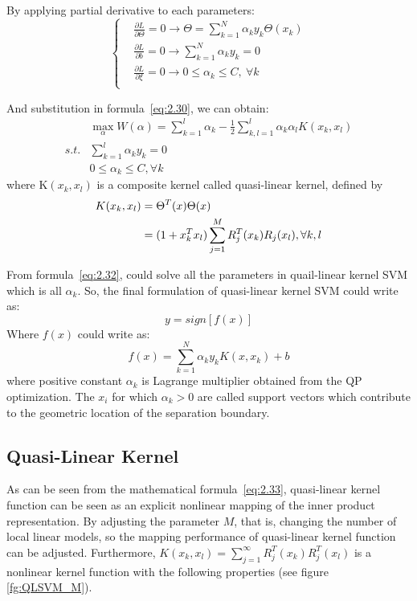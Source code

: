 \documentclass[master]{IPSstyle}
\begin{document}
{By applying partial derivative to each parameters:
\begin{equation}\label{eq:2.31}
\left\{ 
\begin{aligned}
&\frac{\partial L}{\partial\Theta}=0 \to \Theta=\sum_{k=1}^{N}\alpha_ky_k\Theta(x_k)\\
&\frac{\partial L}{\partial b}=0 \to \sum_{k=1}^{N}\alpha_ky_k = 0 \\
&\frac{\partial L}{\partial \xi}=0 \to 0 \leq \alpha_k \leq C, ~\forall k \\
\end{aligned}
\right.
\end{equation}

And substitution in formula~\ref{eq:2.30}, we can obtain:
\begin{equation}
\begin{aligned} \label{eq:2.32}
&\max_{\alpha} W(\alpha) = \sum_{k=1}^{l}\alpha_k-\frac{1}{2}\sum_{k,l=1}^{l}\alpha_k\alpha_lK(x_k,x_l) \\ 
s.t. &\sum_{k=1}^{l}\alpha_ky_k=0 \\ 
& 0\leq\alpha_k\leq C, \forall k
\end{aligned}
\end{equation}
where $\mathrm{K}(x_k,x_l)$ is a composite kernel called quasi-linear kernel, defined by
\begin{align} \label{eq:2.33}
K(x_k,x_l)&=\Theta^T(x)\Theta(x)\\ \notag
		       &=(1+x_k^Tx_l)\sum_{j=1}^{M}R_j^T(x_k)R_j(x_l), \forall k,l
\end{align}

From formula~\ref{eq:2.32}, could solve all the parameters in quail-linear kernel SVM which is all $\alpha_k$. So, the final formulation of quasi-linear kernel SVM could write as:
\begin{equation}\label{eq:2.34}
y = sign\left[f(x)\right]
\end{equation}
Where $f(x)$ could write as:
\begin{equation} \label{eq:2.35}
f(x) = \sum_{k=1}^{N}\alpha_ky_kK(x, x_k) + b
\end{equation}
where positive constant $\alpha_k$ is Lagrange multiplier obtained from the QP optimization. The $x_i$ for which $\alpha_k>0$ are called support vectors which contribute to the geometric location of the separation boundary.

\subsection{Quasi-Linear Kernel}
As can be seen from the mathematical formula~\ref{eq:2.33}, quasi-linear kernel function can be seen as an explicit nonlinear mapping of the inner product representation. By adjusting the parameter $M$, that is, changing the number of local linear models, so the mapping performance of quasi-linear kernel function can be adjusted. Furthermore, $K(x_k, x_l) = \sum_{j=1}^{\infty} R_j^T(x_k)R_j^T(x_l)$ is a nonlinear kernel function with the following properties (see figure \ref{fg:QLSVM_M}).

}
\end{document}
